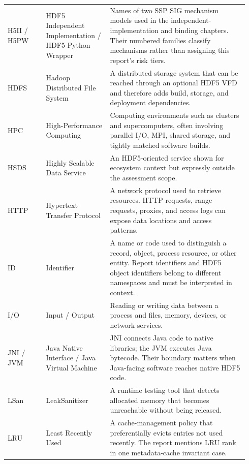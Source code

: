 \documentclass[../main.tex]{subfiles}
\begin{document}
\begin{longtable}{@{}>{\raggedright\arraybackslash}p{0.15\linewidth}>{\raggedright\arraybackslash}p{0.25\linewidth}p{0.54\linewidth}@{}}
H5II / H5PW & HDF5 Independent Implementation / HDF5 Python Wrapper &
Names of two SSP SIG mechanism models used in the independent-implementation
and binding chapters. Their numbered families classify mechanisms rather than
assigning this report's risk tiers. \\

HDFS & Hadoop Distributed File System &
A distributed storage system that can be reached through an optional HDF5 VFD
and therefore adds build, storage, and deployment dependencies. \\

HPC & High-Performance Computing &
Computing environments such as clusters and supercomputers, often involving
parallel I/O, MPI, shared storage, and tightly matched software builds. \\

HSDS & Highly Scalable Data Service &
An HDF5-oriented service shown for ecosystem context but expressly outside the
assessment scope. \\

HTTP & Hypertext Transfer Protocol &
A network protocol used to retrieve resources. HTTP requests, range requests,
proxies, and access logs can expose data locations and access patterns. \\

ID & Identifier &
A name or code used to distinguish a record, object, process resource, or other
entity. Report identifiers and HDF5 object identifiers belong to different
namespaces and must be interpreted in context. \\

I/O & Input / Output &
Reading or writing data between a process and files, memory, devices, or
network services. \\

JNI / JVM & Java Native Interface / Java Virtual Machine &
JNI connects Java code to native libraries; the JVM executes Java bytecode.
Their boundary matters when Java-facing software reaches native HDF5 code. \\

LSan & LeakSanitizer &
A runtime testing tool that detects allocated memory that becomes unreachable
without being released. \\

LRU & Least Recently Used &
A cache-management policy that preferentially evicts entries not used recently.
The report mentions LRU rank in one metadata-cache invariant case. \\


\end{longtable}
\end{document}
